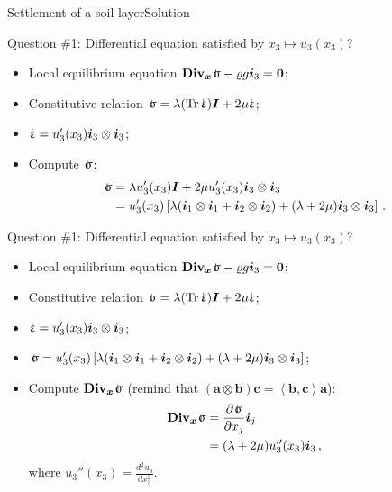 \documentclass{beamer}
\newcommand{\trace}{\operatorname{Tr}}
\newcommand{\id}{d}
\newcommand{\Id}{{\boldsymbol I}}
\newcommand{\aj}{a}
\newcommand{\bj}{b}
\newcommand{\cj}{c}
\newcommand{\av}{{\boldsymbol\aj}}
\newcommand{\bv}{{\boldsymbol\bj}}
\newcommand{\cv}{{\boldsymbol\cj}}
\newcommand{\uj}{u}
\newcommand{\xj}{x}
\newcommand{\xv}{{\boldsymbol\xj}}
\newcommand{\Div}{\mathbf{Div}}
\newcommand{\Divx}{{\Div_\xv}}
\renewcommand{\ij}{i}
\newcommand{\iv}{{\boldsymbol\ij}}
\newcommand*{\strain}{\mbox{$\hspace{0.2em}\rotatebox[x=0pt,y=0.2pt]{90}{\rule{0.02\linewidth}{0.4pt}}\hspace{-0.23em}\upvarepsilon$}}
\newcommand{\roi}{\varrho}
\newcommand{\stress}{\mbox{$\hspace{0.3em}\rotatebox[x=0pt,y=0.2pt]{90}{\rule{0.017\linewidth}{0.4pt}}\hspace{-0.25em}\upsigma$}}
\newcommand{\bzero}{{\bf 0}}
\newcommand{\scal}[1]{\left\langle{#1}\right\rangle}
\begin{document}
\begin{frame}{Settlement of a soil layer}{Solution}
\begin{overprint}
\vskip-20pt
\begin{exampleblock}{Question \#1: Differential equation satisfied by $\xj_3\mapsto\uj_3(\xj_3)$?}
\begin{itemize}
\item Local equilibrium equation $\Divx\stress-\roi g\iv_3=\bzero$;
\item Constitutive relation $\stress=\lambda(\trace\strain)\Id+2\mu\strain$;
\item $\strain=\uj_3'(\xj_3)\iv_3\otimes\iv_3$;
\item Compute $\stress$: 
\begin{displaymath}
\begin{split}
\stress &=\lambda\uj_3'(\xj_3)\Id+2\mu\uj_3'(\xj_3)\iv_3\otimes\iv_3\\
&=\uj_3'(\xj_3)\left[\lambda(\iv_1\otimes\iv_1+\iv_2\otimes\iv_2)+(\lambda+2\mu)\iv_3\otimes\iv_3\right]\,.
\end{split}
\end{displaymath}
\end{itemize}
\end{exampleblock}

\vskip-20pt
\begin{exampleblock}{Question \#1: Differential equation satisfied by $\xj_3\mapsto\uj_3(\xj_3)$?}
\begin{itemize}
\item Local equilibrium equation $\Divx\stress-\roi g\iv_3=\bzero$;
\item Constitutive relation $\stress=\lambda(\trace\strain)\Id+2\mu\strain$;
\item $\strain=\uj_3'(\xj_3)\iv_3\otimes\iv_3$;
\item $\stress=\uj_3'(\xj_3)\left[\lambda(\iv_1\otimes\iv_1+\iv_2\otimes\iv_2)+(\lambda+2\mu)\iv_3\otimes\iv_3\right]$;
\item Compute $\Divx\stress$ (remind that $(\av\otimes\bv)\cv=\scal{\bv,\cv}\av$): 
\begin{displaymath}
\begin{split}
\Divx\stress &=\frac{\partial\stress}{\partial\xj_j}\iv_j\\
&=(\lambda+2\mu)\uj_3''(\xj_3)\iv_3\,,
\end{split}
\end{displaymath}
where $\uj_3''(\xj_3)=\frac{\id^2\uj_3}{\id\xj_3^2}$.
\end{itemize}
\end{exampleblock}


\end{overprint}
\end{frame}
\end{document}
